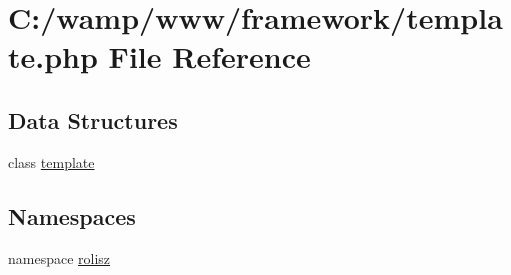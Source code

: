 \hypertarget{template_8php}{
\section{C:/wamp/www/framework/template.php File Reference}
\label{template_8php}
}
\subsection*{Data Structures}
\begin{DoxyCompactItemize}
\item 
class \hyperlink{classtemplate}{template}
\end{DoxyCompactItemize}
\subsection*{Namespaces}
\begin{DoxyCompactItemize}
\item 
namespace \hyperlink{namespacerolisz}{rolisz}
\end{DoxyCompactItemize}
